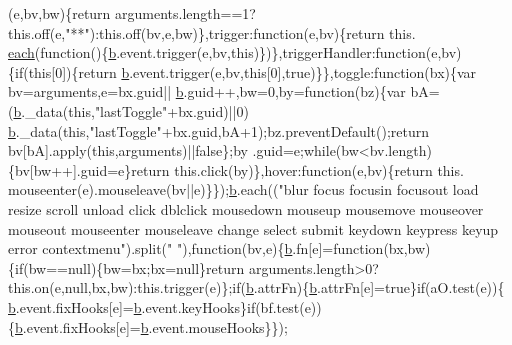 \begin{DoxyCode}
      (e,bv,bw)\{\textcolor{keywordflow}{return} arguments.length==1?this.off(e,\textcolor{stringliteral}{"**"}):this.off(bv,e,bw)\},trigger:function(e,bv)\{\textcolor{keywordflow}{return} this.
      \hyperlink{a00039_a871ff39db627c54c710a3e9909b8234c}{each}(\textcolor{keyword}{function}()\{\hyperlink{a00039_aa4026ad5544b958e54ce5e106fa1c805}{b}.event.trigger(e,bv,\textcolor{keyword}{this})\})\},triggerHandler:\textcolor{keyword}{function}(e,bv)\{\textcolor{keywordflow}{if}(\textcolor{keyword}{this}[0])\{\textcolor{keywordflow}{return} 
      \hyperlink{a00039_aa4026ad5544b958e54ce5e106fa1c805}{b}.event.trigger(e,bv,\textcolor{keyword}{this}[0],\textcolor{keyword}{true})\}\},toggle:\textcolor{keyword}{function}(bx)\{var bv=arguments,e=bx.guid||
      \hyperlink{a00039_aa4026ad5544b958e54ce5e106fa1c805}{b}.guid++,bw=0,by=\textcolor{keyword}{function}(bz)\{var bA=(\hyperlink{a00039_aa4026ad5544b958e54ce5e106fa1c805}{b}.\_data(\textcolor{keyword}{this},\textcolor{stringliteral}{"lastToggle"}+bx.guid)||0)%
      \hyperlink{a00039_aa4026ad5544b958e54ce5e106fa1c805}{b}.\_data(\textcolor{keyword}{this},\textcolor{stringliteral}{"lastToggle"}+bx.guid,bA+1);bz.preventDefault();\textcolor{keywordflow}{return} bv[bA].apply(\textcolor{keyword}{this},arguments)||\textcolor{keyword}{false}\};by
      .guid=e;\textcolor{keywordflow}{while}(bw<bv.length)\{bv[bw++].guid=e\}\textcolor{keywordflow}{return} this.click(by)\},hover:\textcolor{keyword}{function}(e,bv)\{\textcolor{keywordflow}{return} this.
      mouseenter(e).mouseleave(bv||e)\}\});\hyperlink{a00039_aa4026ad5544b958e54ce5e106fa1c805}{b}.each((\textcolor{stringliteral}{"blur focus focusin focusout load resize scroll unload click dblclick
       mousedown mouseup mousemove mouseover mouseout mouseenter mouseleave change select submit keydown keypress
       keyup error contextmenu"}).split(\textcolor{stringliteral}{" "}),\textcolor{keyword}{function}(bv,e)\{\hyperlink{a00039_aa4026ad5544b958e54ce5e106fa1c805}{b}.fn[e]=\textcolor{keyword}{function}(bx,bw)\{\textcolor{keywordflow}{if}(bw==null)\{bw=bx;bx=null\}\textcolor{keywordflow}{return} 
      arguments.length>0?this.on(e,null,bx,bw):this.trigger(e)\};\textcolor{keywordflow}{if}(\hyperlink{a00039_aa4026ad5544b958e54ce5e106fa1c805}{b}.attrFn)\{\hyperlink{a00039_aa4026ad5544b958e54ce5e106fa1c805}{b}.attrFn[e]=\textcolor{keyword}{true}\}\textcolor{keywordflow}{if}(aO.test(e))\{
      \hyperlink{a00039_aa4026ad5544b958e54ce5e106fa1c805}{b}.event.fixHooks[e]=\hyperlink{a00039_aa4026ad5544b958e54ce5e106fa1c805}{b}.event.keyHooks\}\textcolor{keywordflow}{if}(bf.test(e))\{\hyperlink{a00039_aa4026ad5544b958e54ce5e106fa1c805}{b}.event.fixHooks[e]=\hyperlink{a00039_aa4026ad5544b958e54ce5e106fa1c805}{b}.event.mouseHooks\}\});


\end{DoxyCode}

